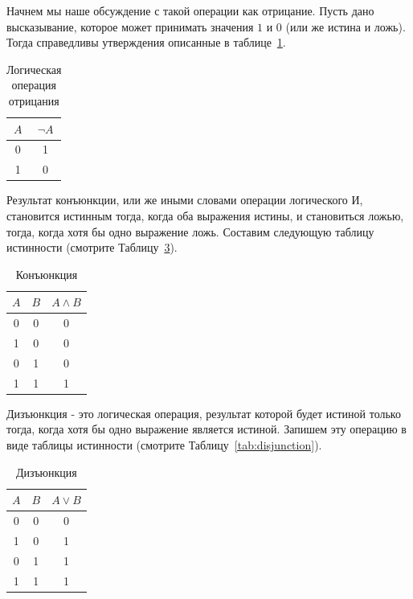 Начнем мы наше обсуждение с такой операции как отрицание. Пусть дано высказывание,
которое может принимать значения $1$ и $0$ (или же истина и ложь). 
Тогда справедливы утверждения описанные в таблице~\ref{tab:negation}.

\begin{table}[!h]
\centering
\begin{tabular}{|c|c|}
\hline
$A$ & $\neg A$ \\\hline
0   & 1 \\\hline
1   & 0 \\\hline
\end{tabular}
\label{tab:negation}
\caption{Логическая операция отрицания}
\end{table}

Результат конъюнкции, или же иными словами операции логического И, становится истинным тогда, когда оба 
выражения истины, и становиться ложью, тогда, когда хотя бы одно выражение ложь. Составим следующую таблицу
истинности (смотрите Таблицу~\ref{tab:conjuction}). 

\begin{table}[!h]
\centering
\begin{tabular}{|c|c|c|}
\hline
$A$ & $B$ & $A \wedge B$ \\\hline
0   &  0  &  0 \\\hline
1   &  0  &  0 \\\hline
0   &  1  &  0 \\\hline
1   &  1  &  1 \\\hline
\end{tabular}
\label{tab:conjuction}
\caption{Конъюнкция}
\end{table}

Дизъюнкция - это логическая операция, результат которой будет истиной только тогда, когда
хотя бы одно выражение является истиной. Запишем эту операцию в виде таблицы истинности (смотрите
Таблицу~\ref{tab:disjunction}).

\begin{table}[!h]
\centering
\begin{tabular}{|c|c|c|}
\hline
$A$ & $B$ & $A \vee B$ \\\hline
0   &  0  &  0 \\\hline
1   &  0  &  1 \\\hline
0   &  1  &  1 \\\hline
1   &  1  &  1 \\\hline
\end{tabular}
\label{tab:conjuction}
\caption{Дизъюнкция}
\end{table}

